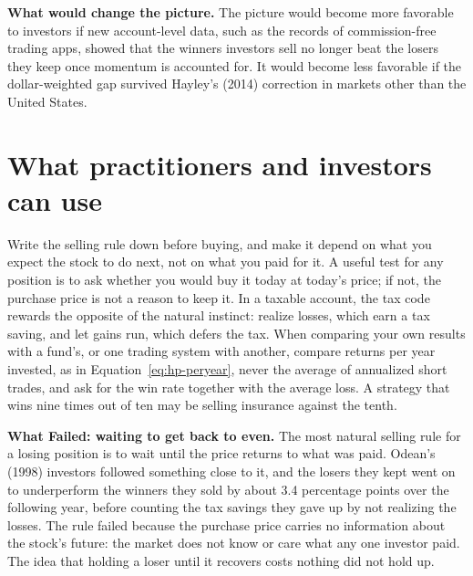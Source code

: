 \textbf{What would change the picture.} The picture would become more favorable to investors if new account-level data, such as the records of commission-free trading apps, showed that the winners investors sell no longer beat the losers they keep once momentum is accounted for. It would become less favorable if the dollar-weighted gap survived Hayley's (2014) correction in markets other than the United States.


\section{What practitioners and investors can use}
\label{sec:hp-investors}

Write the selling rule down before buying, and make it depend on what you expect the stock to do next, not on what you paid for it. A useful test for any position is to ask whether you would buy it today at today's price; if not, the purchase price is not a reason to keep it. In a taxable account, the tax code rewards the opposite of the natural instinct: realize losses, which earn a tax saving, and let gains run, which defers the tax. When comparing your own results with a fund's, or one trading system with another, compare returns per year invested, as in Equation~\eqref{eq:hp-peryear}, never the average of annualized short trades, and ask for the win rate together with the average loss. A strategy that wins nine times out of ten may be selling insurance against the tenth.

\begin{callout}
\textbf{What Failed: waiting to get back to even.} The most natural selling rule for a losing position is to wait until the price returns to what was paid. Odean's (1998) investors followed something close to it, and the losers they kept went on to underperform the winners they sold by about 3.4 percentage points over the following year, before counting the tax savings they gave up by not realizing the losses. The rule failed because the purchase price carries no information about the stock's future: the market does not know or care what any one investor paid. The idea that holding a loser until it recovers costs nothing did not hold up.
\end{callout}

\makeatletter
{}
\makeatother

